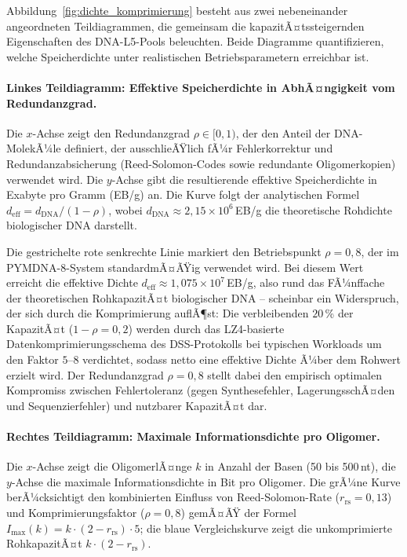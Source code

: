 ﻿\documentclass[a4paper,12pt]{article}
\theoremstyle{definition}
\begin{document}
Abbildung~\ref{fig:dichte_komprimierung} besteht aus zwei nebeneinander angeordneten Teildiagrammen, die gemeinsam die kapazitÃ¤tssteigernden Eigenschaften des DNA-L5-Pools beleuchten. Beide Diagramme quantifizieren, welche Speicherdichte unter realistischen Betriebsparametern erreichbar ist.

\paragraph{Linkes Teildiagramm: Effektive Speicherdichte in AbhÃ¤ngigkeit vom Redundanzgrad.}
Die $x$-Achse zeigt den Redundanzgrad $\rho \in [0, 1)$, der den Anteil der DNA-MolekÃ¼le definiert, der ausschlieÃŸlich fÃ¼r Fehlerkorrektur und Redundanzabsicherung (Reed-Solomon-Codes sowie redundante Oligomerkopien) verwendet wird. Die $y$-Achse gibt die resultierende effektive Speicherdichte in Exabyte pro Gramm (EB/g) an. Die Kurve folgt der analytischen Formel $d_{\mathrm{eff}} = d_{\mathrm{DNA}} / (1 - \rho)$, wobei $d_{\mathrm{DNA}} \approx 2{,}15 \times 10^{6}$\,EB/g die theoretische Rohdichte biologischer DNA darstellt.

Die gestrichelte rote senkrechte Linie markiert den Betriebspunkt $\rho = 0{,}8$, der im PYMDNA-8-System standardmÃ¤ÃŸig verwendet wird. Bei diesem Wert erreicht die effektive Dichte $d_{\mathrm{eff}} \approx 1{,}075 \times 10^{7}$\,EB/g, also rund das FÃ¼nffache der theoretischen RohkapazitÃ¤t biologischer DNA -- scheinbar ein Widerspruch, der sich durch die Komprimierung auflÃ¶st: Die verbleibenden $20$\,\% der KapazitÃ¤t ($1 - \rho = 0{,}2$) werden durch das LZ4-basierte Datenkomprimierungsschema des DSS-Protokolls bei typischen Workloads um den Faktor $5$--$8$ verdichtet, sodass netto eine effektive Dichte Ã¼ber dem Rohwert erzielt wird. Der Redundanzgrad $\rho = 0{,}8$ stellt dabei den empirisch optimalen Kompromiss zwischen Fehlertoleranz (gegen Synthesefehler, LagerungsschÃ¤den und Sequenzierfehler) und nutzbarer KapazitÃ¤t dar.

\paragraph{Rechtes Teildiagramm: Maximale Informationsdichte pro Oligomer.}
Die $x$-Achse zeigt die OligomerlÃ¤nge $k$ in Anzahl der Basen (50 bis 500\,nt), die $y$-Achse die maximale Informationsdichte in Bit pro Oligomer. Die grÃ¼ne Kurve berÃ¼cksichtigt den kombinierten Einfluss von Reed-Solomon-Rate ($r_{\mathrm{rs}} = 0{,}13$) und Komprimierungsfaktor ($\rho = 0{,}8$) gemÃ¤ÃŸ der Formel $I_{\max}(k) = k \cdot (2 - r_{\mathrm{rs}}) \cdot 5$; die blaue Vergleichskurve zeigt die unkomprimierte RohkapazitÃ¤t $k \cdot (2 - r_{\mathrm{rs}})$.
\end{document}
